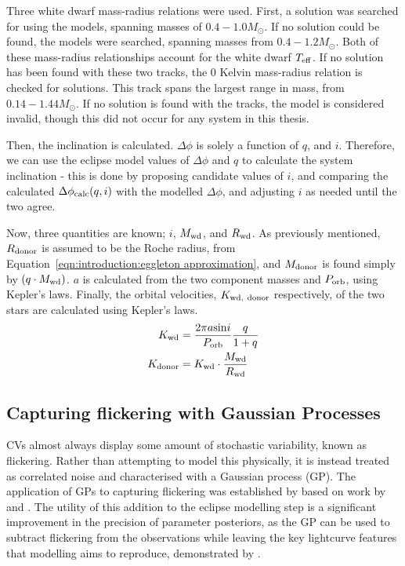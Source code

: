 Three white dwarf mass-radius relations were used. First, a solution was searched for using the \citet{wood1995} models, spanning masses of $0.4 - 1.0 M_\odot$.
If no solution could be found, the \citet{panei2000} models were searched, spanning masses from $0.4 - 1.2 M_\odot$.
Both of these mass-radius relationships account for the white dwarf $T_{\rm eff}$.
If no solution has been found with these two tracks, the \citet{hamada1961} 0 Kelvin mass-radius relation is checked for solutions. This track spans the largest range in mass, from $0.14 - 1.44 M_\odot$. If no solution is found with the \citet{hamada1961} tracks, the model is considered invalid, though this did not occur for any system in this thesis.

Then, the inclination is calculated. $\Delta \phi$ is solely a function of $q$, and $i$. Therefore, we can use the eclipse model values of $\Delta\phi$ and $q$ to calculate the system inclination - this is done by proposing candidate values of $i$, and comparing the calculated $\Delta \phi_{\rm calc}(q,i)$ with the modelled $\Delta \phi$, and adjusting $i$ as needed until the two agree.

Now, three quantities are known; $i$, $M_{\rm wd}$, and $R_{\rm wd}$. As previously mentioned, $R_{\rm donor}$ is assumed to be the Roche radius, from Equation~\ref{eqn:introduction:eggleton approximation}, and $M_{\rm donor}$ is found simply by $(q \cdot M_{\rm wd})$. $a$ is calculated from the two component masses and $P_{\rm orb}$, using Kepler's laws. Finally, the orbital velocities, $K_{\rm wd,\ donor}$ respectively, of the two stars are calculated using Kepler's laws.
\begin{align}
    K_{\rm wd} &= \frac{2\pi a \mathrm{sin}i}{P_{\rm orb}} \frac{q}{1+q} \\
    K_{\rm donor} &= K_{\rm wd} \cdot \frac{M_{\rm wd}}{R_{\rm wd}}
\end{align}


\subsection{Capturing flickering with Gaussian Processes}

CVs almost always display some amount of stochastic variability, known as flickering. Rather than attempting to model this physically, it is instead treated as correlated noise and characterised with a Gaussian process (GP).
The application of GPs to capturing flickering was established by \citet{McAllister2017} based on work by \citet{roberts2012} and \citet{gibson2012}.
The utility of this addition to the eclipse modelling step is a significant improvement in the precision of parameter posteriors, as the GP can be used to subtract flickering from the observations while leaving the key lightcurve features that modelling aims to reproduce, demonstrated by \citet{McAllister2017}.

